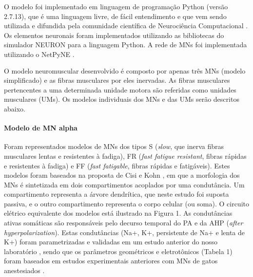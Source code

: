 O modelo foi implementado em linguagem de programação Python (versão 2.7.13), que é uma linguagem livre, de fácil entendimento \cite{Lutz2013} e que vem sendo utilizada e difundida pela comunidade científica de Neurociência Computacional \cite{Muller2015}. Os elementos neuronais foram implementados utilizando as bibliotecas do simulador NEURON \cite{carnevale2006neuron} para a linguagem Python. A rede de MNs foi implementada utilizando o NetPyNE \cite{Dura-Bernal2016}.

O modelo neuromuscular desenvolvido é composto por apenas três MNs (modelo simplificado) e as fibras musculares por eles inervadas. As fibras musculares pertencentes a uma determinada unidade motora são referidas como unidades musculares (UMs). Os modelos individuais dos MNs e das UMs serão descritos abaixo.

\paragraph{Modelo de MN alpha}
Foram representados modelos de MNs dos tipos S (\emph{slow}, que inerva fibras musculares lentas e resistentes à fadiga), FR (\emph{fast fatigue resistant}, fibras rápidas e resistentes à fadiga) e FF (\emph{fast fatigable}, fibras rápidas e fatigáveis). Estes modelos foram baseados na proposta de Cisi e Kohn \cite{Cisi2008a}, em que a morfologia dos MNs é sintetizada em dois compartimentos acoplados por uma condutância. Um compartimento representa a árvore dendrítica, que neste estudo foi suposta passiva, e o outro compartimento representa o corpo celular (ou soma). O circuito elétrico equivalente dos modelos está ilustrado na Figura 1. As condutâncias ativas somáticas são responsáveis pelo decurso temporal do PA e da AHP (\emph{after hyperpolarization}). Estas condutâncias (Na+, K+, persistente de Na+ e lenta de K+) foram parametrizadas e validadas em um estudo anterior do nosso laboratório \cite{Matoso2017}, sendo que os parâmetros geométricos e eletrotônicos (Tabela 1) foram baseados em estudos experimentais anteriores com MNs de gatos anestesiados \cite{Crill1996,Fleshman1988,Zengel1985}.

